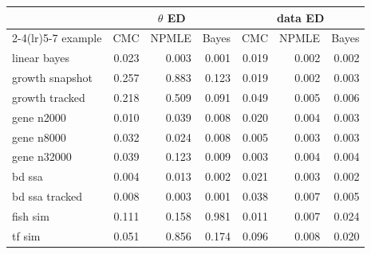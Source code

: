 \begin{tabular}{lrrrrrr}
\toprule
 & \multicolumn{3}{c}{$\theta$ ED} & \multicolumn{3}{c}{data ED} \\
\cmidrule(lr){2-4}\cmidrule(lr){5-7}
example & CMC & NPMLE & Bayes & CMC & NPMLE & Bayes \\
\midrule
linear bayes & 0.023 & 0.003 & 0.001 & 0.019 & 0.002 & 0.002 \\
growth snapshot & 0.257 & 0.883 & 0.123 & 0.019 & 0.002 & 0.003 \\
growth tracked & 0.218 & 0.509 & 0.091 & 0.049 & 0.005 & 0.006 \\
gene n2000 & 0.010 & 0.039 & 0.008 & 0.020 & 0.004 & 0.003 \\
gene n8000 & 0.032 & 0.024 & 0.008 & 0.005 & 0.003 & 0.003 \\
gene n32000 & 0.039 & 0.123 & 0.009 & 0.003 & 0.004 & 0.004 \\
bd ssa & 0.004 & 0.013 & 0.002 & 0.021 & 0.003 & 0.002 \\
bd ssa tracked & 0.008 & 0.003 & 0.001 & 0.038 & 0.007 & 0.005 \\
fish sim & 0.111 & 0.158 & 0.981 & 0.011 & 0.007 & 0.024 \\
tf sim & 0.051 & 0.856 & 0.174 & 0.096 & 0.008 & 0.020 \\
\bottomrule
\end{tabular}
